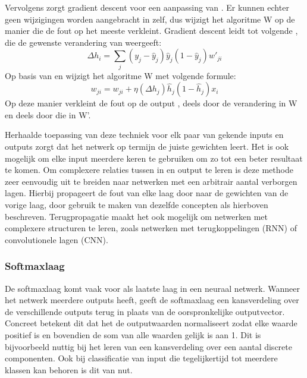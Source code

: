 Vervolgens zorgt gradient descent voor een aanpassing van . Er kunnen echter geen wijzigingen worden aangebracht in  zelf, dus wijzigt het algoritme {W} op de manier die de fout op  het meeste verkleint. Gradient descent leidt tot volgende , die de gewenste verandering van  weergeeft:
\begin{equation}
    \Delta h_i = \sum\limits_{j}(y_j-\hat{y}_j)\hat{y}_j(1-\hat{y}_j)w'_{ji}
\end{equation}
Op basis van  en  wijzigt het algoritme {W} met volgende formule:
\begin{equation}
    w_{ji} = w_{ji} + \eta(\Delta h_j)\hat{h}_j(1-\hat{h}_j)x_i
\end{equation}
Op deze manier verkleint de fout op de output , deels door de verandering in {W} en deels door die in {W'}\cite{Blockeel}.

Herhaalde toepassing van deze techniek voor elk paar van gekende inputs en outputs zorgt dat het netwerk op termijn de juiste gewichten leert. Het is ook mogelijk om elke input meerdere keren te gebruiken om zo tot een beter resultaat te komen. Om complexere relaties tussen in en output te leren is deze methode zeer eenvoudig uit te breiden naar netwerken met een arbitrair aantal verborgen lagen. Hierbij propageert de fout van elke laag door naar de gewichten van de vorige laag, door gebruik te maken van dezelfde concepten als hierboven beschreven. Terugpropagatie maakt het ook mogelijk om netwerken met complexere structuren te leren, zoals netwerken met terugkoppelingen (RNN) of convolutionele lagen (CNN).

\subsubsection{Softmaxlaag}\label{par:softmax}
De softmaxlaag komt vaak voor als laatste laag in een neuraal netwerk. Wanneer het netwerk meerdere outputs heeft, geeft de softmaxlaag een kansverdeling over de verschillende outputs terug in plaats van de oorspronkelijke outputvector. Concreet betekent dit dat het de outputwaarden normaliseert zodat elke waarde positief is en bovendien de som van alle waarden gelijk is aan 1. Dit is bijvoorbeeld nuttig bij het leren van een kansverdeling over een aantal discrete componenten. Ook bij classificatie van input die tegelijkertijd tot meerdere klassen kan behoren is dit van nut.

